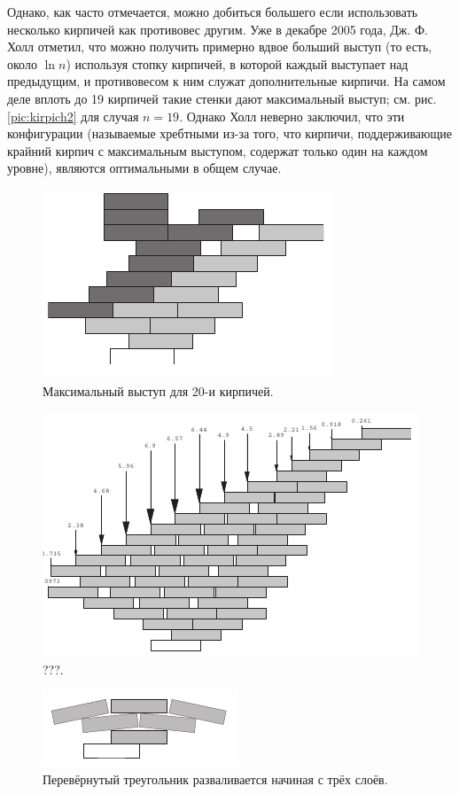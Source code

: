 Однако, как часто отмечается, можно добиться большего если использовать несколько кирпичей как противовес другим.
Уже в декабре 2005 года, Дж. Ф. Холл \cite{35} отметил, что можно получить примерно вдвое больший выступ (то есть, около $\ln n$) используя стопку кирпичей, в которой каждый выступает над предыдущим, и противовесом к ним служат дополнительные кирпичи. %
На самом деле вплоть до 19 кирпичей такие стенки дают максимальный выступ; см. рис. \ref{pic:kirpich2} для случая $n = 19$.
Однако Холл неверно заключил, что эти конфигурации (называемые хребтными из-за того, что кирпичи, поддерживающие крайний кирпич с максимальным выступом, содержат только один на каждом уровне), являются оптимальными в общем случае.

\begin{figure}[htb!]
\centering
\includegraphics[scale=1]{pics/kirpich3}
\caption{Максимальный выступ для 20-и кирпичей.}
\label{pic:kirpich3}
\end{figure}

\begin{figure}[htb!]
\centering
\includegraphics[scale=1]{pics/kirpich4}
\caption{???.}
\label{pic:kirpich4}
\end{figure}

\begin{figure}[htb!]
\centering
\includegraphics[scale=1]{pics/kirpich5}
\caption{Перевёрнутый треугольник разваливается начиная с трёх слоёв.}
\label{pic:kirpich5}
\end{figure}

